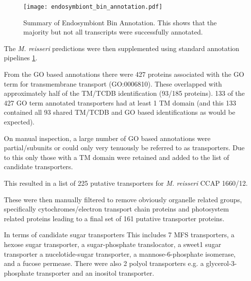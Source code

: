 \begin{figure}
    \centering
    \texttt{[image: endosymbiont\_bin\_annotation.pdf]}
    \caption[Summary of \textit{M. reisseri} endosymbiont bin annotation]{Summary
    of Endosymbiont Bin Annotation. This shows that the majority but not all transcripts
were successfully annotated.} 
\label{fig:endo_annot}
\end{figure}

The \textit{M. reisseri} predictions were then supplemented using standard
annotation pipelines \cref{fig:endo_annot}.

From the GO based annotations there were 427 proteins associated
with the GO term for transmembrane transport (GO:0006810).
These overlapped with approximately half of the TM/TCDB identification 
(93/185 proteins).  133 of the 427 GO term annotated transporters
had at least 1 TM domain (and this 133 contained all 93 shared TM/TCDB and GO 
based identifications as would be expected). 

On manual inspection, a large number of GO based annotations were partial/subunits
or could only very tenuously be referred to as transporters. 
Due to this only those with a TM domain were retained and added to the list
of candidate transporters. 

This resulted in a list of 225 putative transporters 
for \textit{M. reisseri} CCAP 1660/12.

These were then manually filtered to remove obviously organelle
related groups, specifically cytochromes/electron transport chain
proteins and photosystem related proteins leading to a final
set of 161 putative transporter proteins.

In terms of candidate sugar transporters 
This includes 7 MFS transporters, a hexose sugar transporter, 
a sugar-phosphate translocator, a sweet1 sugar transporter
a nucelotide-sugar transporter, a mannose-6-phosphate isomerase,
and a fucose permease. 
There were also 2 polyol transporters e.g. a glycerol-3-phosphate transporter
and an inositol transporter.

